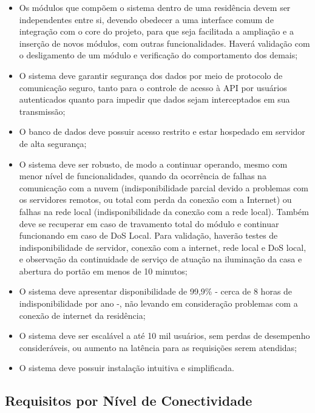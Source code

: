 \begin{itemize}
\item Os módulos que compõem o sistema dentro de uma residência devem ser independentes entre si, devendo obedecer a uma interface comum de integração com o core do projeto, para que seja facilitada a ampliação e a inserção de novos módulos, com outras funcionalidades. Haverá validação com o desligamento de um módulo e verificação do comportamento dos demais;
\item O sistema deve garantir segurança dos dados por meio de protocolo de comunicação seguro, tanto para o controle de acesso à API por usuários autenticados quanto para impedir que dados sejam interceptados em sua transmissão;
\item O banco de dados deve possuir acesso restrito e estar hospedado em servidor de alta segurança;
\item O sistema deve ser robusto, de modo a continuar operando, mesmo com menor nível de funcionalidades, quando da ocorrência de falhas na comunicação com a nuvem (indisponibilidade parcial devido a problemas com os servidores remotos, ou total com perda da conexão com a Internet) ou falhas na rede local (indisponibilidade da conexão com a rede local). Também deve se recuperar em caso de travamento total do módulo e continuar funcionando em caso de DoS Local. Para validação, haverão testes de indisponibilidade de servidor, conexão com a internet, rede local e DoS local, e observação da continuidade de serviço de atuação na iluminação da casa e abertura do portão em menos de 10 minutos;
\item O sistema deve apresentar disponibilidade de 99,9\% - cerca de 8 horas de indisponibilidade por ano -, não levando em consideração problemas com a conexão de internet da residência;
\item O sistema deve ser escalável a até 10 mil usuários, sem perdas de desempenho consideráveis, ou aumento na latência para as requisições serem atendidas;
\item O sistema deve possuir instalação intuitiva e simplificada.
\end{itemize}

\subsection{Requisitos por Nível de Conectividade}

